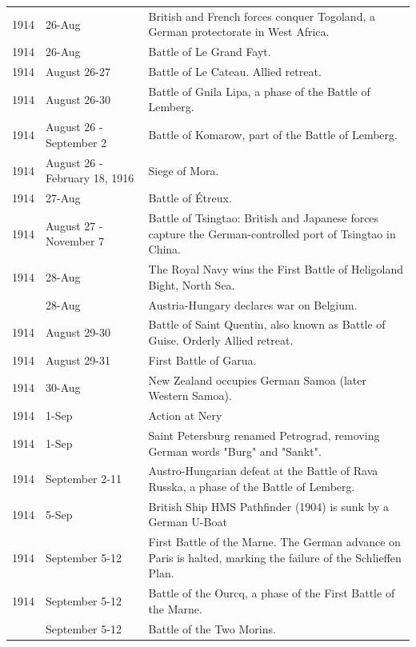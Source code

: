 \documentclass[
  openany]{book}
\begin{document}
\begin{longtable}[t]{rl>{\raggedright\arraybackslash}p{22em}}
\rowcolor{gray!6}  1914 & 26-Aug & British and French forces conquer Togoland, a German protectorate in West Africa.\\
1914 & 26-Aug & Battle of Le Grand Fayt.\\
\rowcolor{gray!6}  1914 & August 26-27 & Battle of Le Cateau. Allied retreat.\\
1914 & August 26-30 & Battle of Gnila Lipa, a phase of the Battle of Lemberg.\\
\addlinespace
\rowcolor{gray!6}  1914 & August 26 - September 2 & Battle of Komarow, part of the Battle of Lemberg.\\
1914 & August 26 - February 18, 1916 & Siege of Mora.\\
\rowcolor{gray!6}  1914 & 27-Aug & Battle of Étreux.\\
1914 & August 27 - November 7 & Battle of Tsingtao: British and Japanese forces capture the German-controlled port of Tsingtao in China.\\
\rowcolor{gray!6}  1914 & 28-Aug & The Royal Navy wins the First Battle of Heligoland Bight, North Sea.\\
\addlinespace
1914 & 28-Aug & Austria-Hungary declares war on Belgium.\\
\rowcolor{gray!6}  1914 & August 29-30 & Battle of Saint Quentin, also known as Battle of Guise. Orderly Allied retreat.\\
1914 & August 29-31 & First Battle of Garua.\\
\rowcolor{gray!6}  1914 & 30-Aug & New Zealand occupies German Samoa (later Western Samoa).\\
1914 & 1-Sep & Action at Nery\\
\addlinespace
\rowcolor{gray!6}  1914 & 1-Sep & Saint Petersburg renamed Petrograd, removing German words "Burg" and "Sankt".\\
1914 & September 2-11 & Austro-Hungarian defeat at the Battle of Rava Russka, a phase of the Battle of Lemberg.\\
\rowcolor{gray!6}  1914 & 5-Sep & British Ship HMS Pathfinder (1904) is sunk by a German U-Boat\\
1914 & September 5-12 & First Battle of the Marne. The German advance on Paris is halted, marking the failure of the Schlieffen Plan.\\
\rowcolor{gray!6}  1914 & September 5-12 & Battle of the Ourcq, a phase of the First Battle of the Marne.\\
\addlinespace
1914 & September 5-12 & Battle of the Two Morins.\\

\end{longtable}
\end{document}
